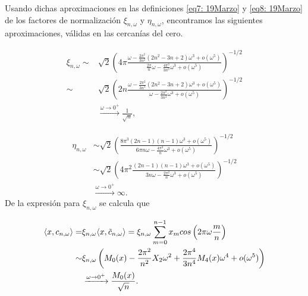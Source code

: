 Usando dichas aproximaciones en 
las definiciones
\eqref{eq7: 19Marzo} y \eqref{eq8: 19Marzo}
de los factores de normalización
$\xi_{n, \omega}$ y $\eta_{n, \omega}$,
encontramos las siguientes aproximaciones,
válidas en las cercanías del cero.
 
\begin{align*}
\xi_{n, \omega} \sim &
\sqrt{2} 
\left(
4 \pi
\frac{                                                                                                                                          
\omega - \frac{2\pi^{2}}{3n^{2}}(2n^2-3n+2)\omega^{3} + o(\omega^{5})
}{
\frac{2\pi}{n} \omega -
\frac{4 \pi^{3}}{3 n^{3}} \omega^{3} + o(\omega^{5})
}
\right)^{-1/2} \\
\sim &
\sqrt{2} 
\left(
2n
\frac{                                                                                                                                          
\omega - \frac{2\pi^{2}}{3n^{2}}(2n^2-3n+2)\omega^{3} + o(\omega^{5})
}{
\omega -
\frac{2 \pi^{2}}{3 n^{2}} \omega^{3} + o(\omega^{5})
}
\right)^{-1/2} \\ &
\xrightarrow{\omega \rightarrow 0^{+}} 
\frac{1}{\sqrt{n}},
\end{align*}

\begin{align*}
\eta_{n, \omega} & \sim 
\sqrt{2} 
\left(
\frac{
8 \pi^{3} (2n-1)(n-1)\omega^{3} + o(\omega^{5})
}{
6 \pi n \omega -
\frac{4 \pi^{3}}{n} \omega^{3} + o(\omega^{5})
}
\right)^{-1/2} \\
& \sim 
\sqrt{2} 
\left(
4\pi^{2}
\frac{
(2n-1)(n-1)\omega^{3} + o(\omega^{5})
}{
3 n \omega -
\frac{2 \pi^{2}}{n} \omega^{3} + o(\omega^{5})
}
\right)^{-1/2}  \\  &
\xrightarrow{\omega \rightarrow 0^{+}} 
\infty.
\end{align*}
De la expresión para $\xi_{n, \omega}$ se calcula que

\noindent
\begin{align*}
\langle x,
c_{n, \omega}
\rangle = & 
\xi_{n, \omega} \langle x,
\tilde{c}_{n, \omega}
\rangle =  
\xi_{n, \omega} \sum\limits_{m=0}^{n-1}x_{m} cos \left(
2 \pi \omega \frac{m}{n}
\right)
\\
\sim &
\xi_{n, \omega} 
\left(
M_{0}(x) - \frac{2 \pi^{2}}{n^{2}}X_{2} \omega^{2} 
+ \frac{2 \pi^{4}}{3n^{4}} M_{4}(x) \omega^{4} + o(\omega^{5})
\right) \\ &
\xrightarrow{\omega \rightarrow 0^{+}} \frac{M_{0}(x)}{\sqrt{n}}
. \\
\end{align*}

